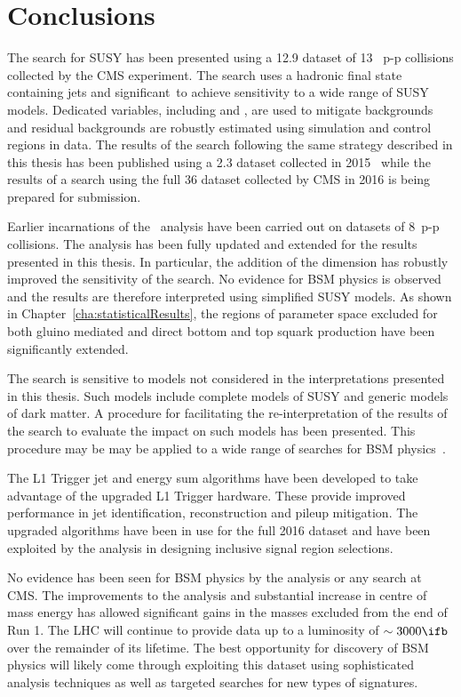 \chapter{Conclusions}

The \alphat search for SUSY has been presented using a 12.9 \ifb 
dataset of 13 \TeV~p-p collisions collected by the CMS experiment. 
The search uses a hadronic final state containing jets and 
significant~\met to achieve sensitivity to a wide range of SUSY
models. Dedicated variables, including \alphat and \bdphi, are used 
to mitigate backgrounds and residual backgrounds 
are robustly estimated using simulation and control regions in data.
The results of the \alphat search following the same strategy
described in this thesis has been published using 
a 2.3 \ifb dataset collected in 2015~\cite{alphat2015} while the results 
of a search using the full 36 \ifb dataset collected by CMS in 2016 
is being prepared for submission.

Earlier incarnations of the \alphat~analysis have been carried out
on datasets of 8\TeV~p-p collisions. The analysis has been
fully updated and extended for the results presented in this thesis. 
In particular, the addition of the \mht dimension has robustly improved the sensitivity of the search. 
No evidence for BSM physics is observed and the results are 
therefore interpreted using simplified SUSY models. As shown in Chapter~\ref{cha:statisticalResults},
the regions of parameter space excluded for both gluino mediated 
and direct bottom and top squark production have been 
significantly extended.

The \alphat search is sensitive to models not considered in the
interpretations presented in this thesis. Such models include 
complete models of SUSY and generic models of dark matter. 
A procedure for facilitating the re-interpretation of the results of the search to evaluate the 
impact on such models has been presented. This procedure may be
may be applied to a wide range of searches for BSM physics~\cite{simp-lik}.

The L1 Trigger jet and energy sum algorithms have been
developed to take advantage of the upgraded L1 Trigger hardware.
These provide improved performance in jet identification, 
reconstruction and pileup mitigation. The upgraded algorithms have
been in use for the full 2016 dataset and have been exploited
by the \alphat analysis in designing inclusive signal region selections.

No evidence has been seen for BSM physics by the \alphat analysis 
or any search at CMS. The improvements to the analysis and substantial
increase in centre of mass energy has allowed significant gains in
the masses excluded from the end of Run 1. The LHC will continue 
to provide data up to a luminosity of $\sim 3000 \ifb$ over the 
remainder of its lifetime. The best opportunity for discovery of 
BSM physics will likely come through exploiting this dataset 
using sophisticated analysis techniques as well as targeted searches 
for new types of signatures.
